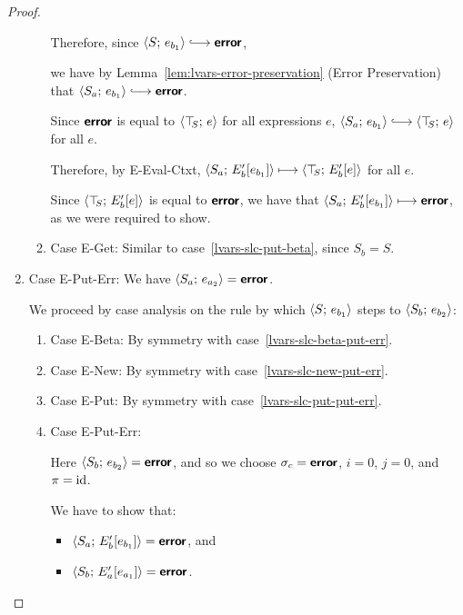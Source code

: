 \begin{proof}
\begin{enumerate}
\begin{enumerate}
      Therefore, since $\config{S}{e_{b_1}} \parstepsto \error$,

      we have by Lemma~\ref{lem:lvars-error-preservation} (Error
      Preservation) that $\config{S_a}{e_{b_1}} \parstepsto \error$.

      Since $\textbf{\textsf{error}}$ is equal to $\langle \top\hspace{-0.85mm}_{S};\, e \rangle$ for all
      expressions $e$, $\config{S_a}{e_{b_1}} \parstepsto
      \config{\topS}{e}$ for all $e$.

      Therefore, by {\sc E-Eval-Ctxt},
      $\langle S_a;\, E'_b\hspace{-0.5mm}\left[e_{b_1}\right] \rangle \longmapsto
      \langle \top\hspace{-0.85mm}_{S};\, E'_b\hspace{-0.5mm}\left[e\right] \rangle$ for all $e$.

      Since $\langle \top\hspace{-0.85mm}_{S};\, E'_b\hspace{-0.5mm}\left[e\right] \rangle$ is equal to $\textbf{\textsf{error}}$,
      we have that $\langle S_a;\, E'_b\hspace{-0.5mm}\left[e_{b_1}\right] \rangle \longmapsto
      \textbf{\textsf{error}}$, as we were required to show.

    \item \label{lvars-slc-put-get}Case {\sc E-Get}: Similar to
      case~\ref{lvars-slc-put-beta}, since $S_b = S$.
    \end{enumerate}
  \item Case {\sc E-Put-Err}: We have $\langle S_a;\, e_{a_2} \rangle =
    \textbf{\textsf{error}}$.

    We proceed by case analysis on the rule by which
    $\langle S;\, e_{b_1} \rangle$ steps to $\langle S_b;\, e_{b_2} \rangle$:
    \begin{enumerate}
    \item \label{lvars-slc-put-err-beta}Case {\sc E-Beta}: By symmetry
      with case~\ref{lvars-slc-beta-put-err}.
    \item \label{lvars-slc-put-err-new}Case {\sc E-New}: By symmetry
      with case~\ref{lvars-slc-new-put-err}.
    \item \label{lvars-slc-put-err-put}Case {\sc E-Put}: By symmetry
      with case~\ref{lvars-slc-put-put-err}.
    \item \label{lvars-slc-put-err-put-err}Case {\sc E-Put-Err}: 

      Here $\langle S_b;\, e_{b_2} \rangle = \textbf{\textsf{error}}$, and so we choose $\sigma_c
      = \textbf{\textsf{error}}$, $i = 0$, $j = 0$, and $\pi = \mathrm{id}$.

      We have to show that:
      \begin{itemize}
      \item $\langle S_a;\, E'_b\hspace{-0.5mm}\left[e_{b_1}\right] \rangle = \textbf{\textsf{error}}$, and
      \item $\langle S_b;\, E'_a\hspace{-0.5mm}\left[e_{a_1}\right] \rangle = \textbf{\textsf{error}}$.
      \end{itemize}


\end{enumerate}
\end{enumerate}
\end{proof}

